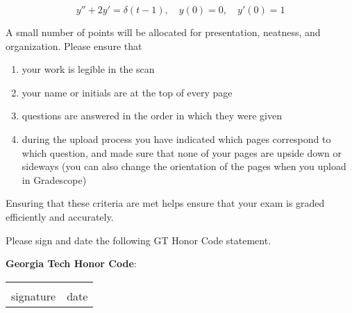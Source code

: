 \documentclass[12pt]{exam}
\begin{document}
\begin{questions}
    $$y'' + 2y' = \delta(t-1), \quad y(0) = 0, \quad y'(0) = 1$$ %

\newpage \Initials
    
    \question[2] A small number of points will be allocated for presentation, neatness, and organization. Please ensure that
    \begin{enumerate}
        \item your work is legible in the scan
        \item your name or initials are at the top of every page
        \item questions are answered in the order in which they were given
        \item during the upload process you have indicated which pages correspond to which question, and made sure that none of your pages are upside down or sideways (you can also change the orientation of the pages when you upload in Gradescope)
    \end{enumerate}
    Ensuring that these criteria are met helps ensure that your exam is graded efficiently and accurately. 
    


    
\end{questions}
    
    Please sign and date the following GT Honor Code statement. \\ 
    \vspace{2pt}
    
    \textbf{Georgia Tech Honor Code}:\ \GTHonorCode
    
    \begin{center}
    \begin{center}
        \def\arraystretch{0.35}%
        \begin{tabular}{ b{8cm} b{8cm} }
        \vspace{.5cm} \underline{\hspace{7cm}} & \vspace{.5cm} \underline{\hspace{4.5cm}}  \tabularnewline
        \vspace{6pt} signature & \vspace{6pt} date    
        \end{tabular}
    \end{center}
    \end{center}    
\end{document}
